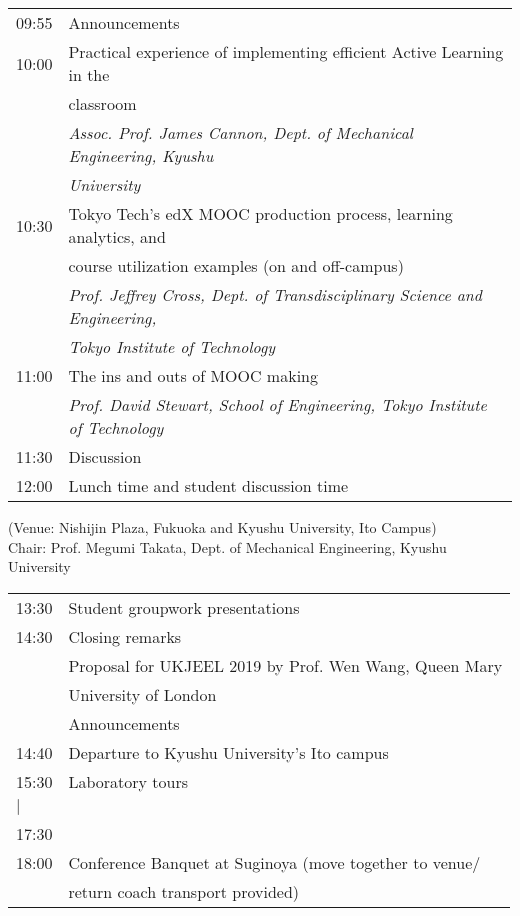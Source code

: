 \noindent\begin{tabular}{|l|l|}
    \hline
    09:55   & Announcements \\
    10:00   & Practical experience of implementing efficient Active Learning in the\\
            & classroom \\
            & \emph{Assoc. Prof. James Cannon, Dept. of Mechanical Engineering, Kyushu}\\
            & \emph{University} \\
    10:30   & Tokyo Tech’s edX MOOC production process, learning analytics, and\\
            & course utilization examples (on and off-campus) \\
            & \emph{Prof. Jeffrey Cross, Dept. of Transdisciplinary Science and Engineering,} \\
            & \emph{Tokyo Institute of Technology} \\
    11:00   & The ins and outs of MOOC making \\
            & \emph{Prof. David Stewart, School of Engineering, Tokyo Institute of Technology} \\
    11:30   & Discussion \\
    12:00   & Lunch time and student discussion time \\

    \hline
\end{tabular}

\newpage
\vspace*{3ex}
 (Venue: Nishijin Plaza, Fukuoka and Kyushu University, Ito Campus) \\
Chair: Prof. Megumi Takata, Dept. of Mechanical Engineering, Kyushu University

\noindent\begin{tabular}{|l|l|}
    \hline
    13:30   & Student groupwork presentations \\
    14:30   & Closing remarks \\
            & Proposal for UKJEEL 2019 by Prof. Wen Wang, Queen Mary\\ 
            & University of London \\
            & Announcements \\
    14:40   & Departure to Kyushu University's Ito campus \\
    15:30   & Laboratory tours \\ %
    \hspace{1em}$\mid$  & \\
    17:30   & \\
    18:00   & Conference Banquet at Suginoya (move together to venue/ \\
            & \hspace{11em} return coach transport provided)\\
    \hline
\end{tabular}


